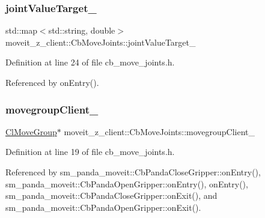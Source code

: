 \subsubsection{\texorpdfstring{joint\+Value\+Target\+\_\+}{jointValueTarget\_}}
{\footnotesize\ttfamily std\+::map$<$std\+::string, double$>$ moveit\+\_\+z\+\_\+client\+::\+Cb\+Move\+Joints\+::joint\+Value\+Target\+\_\+}



Definition at line 24 of file cb\+\_\+move\+\_\+joints.\+h.



Referenced by on\+Entry().

\mbox{\label{classmoveit__z__client_1_1CbMoveJoints_a2ce2e613b676025766dcd2f01ae50810}} 
\subsubsection{\texorpdfstring{movegroup\+Client\+\_\+}{movegroupClient\_}}
{\footnotesize\ttfamily \hyperlink{classmoveit__z__client_1_1ClMoveGroup}{Cl\+Move\+Group}$\ast$ moveit\+\_\+z\+\_\+client\+::\+Cb\+Move\+Joints\+::movegroup\+Client\+\_\+\hspace{0.3cm}{\ttfamily [protected]}}



Definition at line 19 of file cb\+\_\+move\+\_\+joints.\+h.



Referenced by sm\+\_\+panda\+\_\+moveit\+::\+Cb\+Panda\+Close\+Gripper\+::on\+Entry(), sm\+\_\+panda\+\_\+moveit\+::\+Cb\+Panda\+Open\+Gripper\+::on\+Entry(), on\+Entry(), sm\+\_\+panda\+\_\+moveit\+::\+Cb\+Panda\+Close\+Gripper\+::on\+Exit(), and sm\+\_\+panda\+\_\+moveit\+::\+Cb\+Panda\+Open\+Gripper\+::on\+Exit().

\mbox{\label{classmoveit__z__client_1_1CbMoveJoints_aadb5410711e277fab3a637cb4835fb3b}} 
